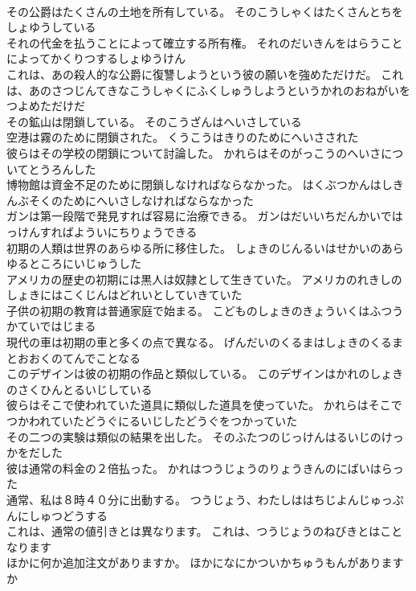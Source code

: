 \documentclass[8pt]{extreport}
\begin{document}
\begin{CJK}{UTF8}{min}
\\	その公爵はたくさんの土地を所有している。	そのこうしゃくはたくさんとちをしょゆうしている 
\\	それの代金を払うことによって確立する所有権。	それのだいきんをはらうことによってかくりつするしょゆうけん 
\\	これは、あの殺人的な公爵に復讐しようという彼の願いを強めただけだ。	これは、あのさつじんてきなこうしゃくにふくしゅうしようというかれのおねがいをつよめただけだ 
\\	その鉱山は閉鎖している。	そのこうざんはへいさしている 
\\	空港は霧のために閉鎖された。	くうこうはきりのためにへいさされた 
\\	彼らはその学校の閉鎖について討論した。	かれらはそのがっこうのへいさについてとうろんした 
\\	博物館は資金不足のために閉鎖しなければならなかった。	はくぶつかんはしきんぶそくのためにへいさしなければならなかった 
\\	ガンは第一段階で発見すれば容易に治療できる。	ガンはだいいちだんかいではっけんすればよういにちりょうできる 
\\	初期の人類は世界のあらゆる所に移住した。	しょきのじんるいはせかいのあらゆるところにいじゅうした 
\\	アメリカの歴史の初期には黒人は奴隷として生きていた。	アメリカのれきしのしょきにはこくじんはどれいとしていきていた 
\\	子供の初期の教育は普通家庭で始まる。	こどものしょきのきょういくはふつうかていではじまる 
\\	現代の車は初期の車と多くの点で異なる。	げんだいのくるまはしょきのくるまとおおくのてんでことなる 
\\	このデザインは彼の初期の作品と類似している。	このデザインはかれのしょきのさくひんとるいじしている 
\\	彼らはそこで使われていた道具に類似した道具を使っていた。	かれらはそこでつかわれていたどうぐにるいじしたどうぐをつかっていた 
\\	その二つの実験は類似の結果を出した。	そのふたつのじっけんはるいじのけっかをだした 
\\	彼は通常の料金の２倍払った。	かれはつうじょうのりょうきんのにばいはらった 
\\	通常、私は８時４０分に出動する。	つうじょう、わたしははちじよんじゅっぷんにしゅつどうする 
\\	これは、通常の値引きとは異なります。	これは、つうじょうのねびきとはことなります 
\\	ほかに何か追加注文がありますか。	ほかになにかついかちゅうもんがありますか 

\end{CJK}
\end{document}

